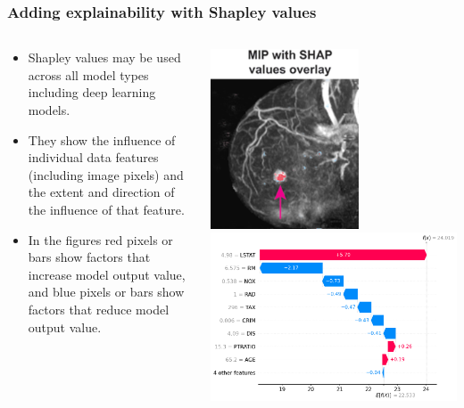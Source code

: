 \begin{frame}
\frametitle{Adding explainability with Shapley values}
\begin{columns}
    \begin{column}{0.57\textwidth}
        \begin{itemize}
            \item Shapley values may be used across all model types including deep learning models.
            \item They show the influence of individual data features (including image pixels) and the extent and direction of the influence of that feature.
            \item In the figures red pixels or bars show factors that increase model output value, and blue pixels or bars show factors that reduce model output value.
        \end{itemize}
    \end{column}
    \begin{column}{0.4\textwidth}
        \begin{center}
        \includegraphics[width=0.6\textwidth]{./misc_images/shap1.png}
        \includegraphics[width=1\textwidth]{./misc_images/shap2.png}
        \end{center}
    \end{column}
\end{columns}
\end{frame}
